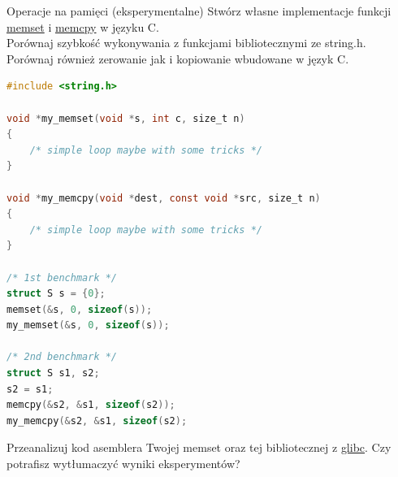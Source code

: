 \begin{exercise}{Operacje na pamięci (eksperymentalne)}{}
Stwórz własne implementacje funkcji \href{https://linux.die.net/man/3/memset}{memset} i \href{http://man7.org/linux/man-pages/man3/memcpy.3.html}{memcpy} w języku C. \\
Porównaj szybkość wykonywania z funkcjami bibliotecznymi ze string.h. \\
Porównaj również zerowanie jak i kopiowanie wbudowane w język C. \\

\begin{lstlisting}[language=C,style=C99]
#include <string.h>

void *my_memset(void *s, int c, size_t n)
{
    /* simple loop maybe with some tricks */
}

void *my_memcpy(void *dest, const void *src, size_t n)
{
    /* simple loop maybe with some tricks */
}

/* 1st benchmark */
struct S s = {0};
memset(&s, 0, sizeof(s));
my_memset(&s, 0, sizeof(s));

/* 2nd benchmark */
struct S s1, s2;
s2 = s1;
memcpy(&s2, &s1, sizeof(s2));
my_memcpy(&s2, &s1, sizeof(s2);
\end{lstlisting}

Przeanalizuj kod asemblera Twojej memset oraz tej bibliotecznej z \href{https://github.molgen.mpg.de/git-mirror/glibc/blob/master/sysdeps/x86_64/memset.S}{glibc}. Czy potrafisz wytłumaczyć wyniki eksperymentów?
\end{exercise}

